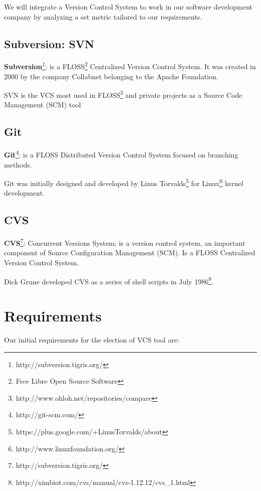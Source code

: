 \documentclass[11pt]{scrartcl}
\begin{document}
\par We will integrate a Version Control System to work in our software development company by analyzing a set metric tailored to our requirements.

\subsection{Subversion: SVN}

\textbf{Subversion}\footnote{http://subversion.tigris.org/}: is a FLOSS\footnote{Free Libre Open Source Software}\label{fn:floss} Centralized Version Control System. It was created in 2000 by the company Collabnet belonging to the Apache Foundation.

\par SVN is the VCS most used in FLOSS\footnote{http://www.ohloh.net/repositories/compare} and private projects as a Source Code Management (SCM) tool

\subsection{Git}

\textbf{Git}\footnote{http://git-scm.com/}: is a FLOSS Distributed Version Control System focused on branching methods.

\par Git was initially designed and developed by Linus Torvalds\footnote{https://plus.google.com/+LinusTorvalds/about} for Linux\footnote{http://www.linuxfoundation.org/} kernel development.

\subsection{CVS}

\textbf{CVS}\footnote{http://subversion.tigris.org/}: Concurrent Versions System; is a version control system, an important component of Source Configuration Management (SCM). Is a FLOSS Centralized Version Control System.

\par Dick Grune developed CVS as a series of shell scripts in July 1986\footnote{http://ximbiot.com/cvs/manual/cvs-1.12.12/cvs\_1.html}.

\section{Requirements}

Our initial requirements for the election of VCS tool are:
\end{document}
